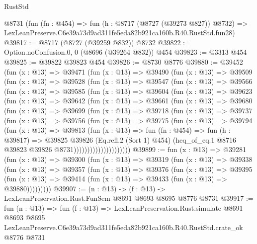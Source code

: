 \begin{lexlean}{RustStd}
\begin{coremodule}
    @8731
    (fun (fn : @454) =>
    fun (h : @8717 (@8727 (@39273 @827)) @8732) =>
    LexLeanPreserve.C6e39a73d9ad311fe5eda82b921ca160b.R40.RustStd.fun28)
@39817 := @8717 (@8727 (@39259 @832)) @8732
@39822 := Option.noConfusion.{0, 0} (@8696 (@39264 @832)) @454
@39823 := @3313 @454
@39825 := @39822 @39823 @454
@39826 := @8730 @8776
@39880 := @39452
    (fun (x : @13) =>
    @39471
      (fun (x : @13) =>
      @39490
        (fun (x : @13) =>
        @39509
          (fun (x : @13) =>
          @39528
            (fun (x : @13) =>
            @39547
              (fun (x : @13) =>
              @39566
                (fun (x : @13) =>
                @39585
                  (fun (x : @13) =>
                  @39604
                    (fun (x : @13) =>
                    @39623
                      (fun (x : @13) =>
                      @39642
                        (fun (x : @13) =>
                        @39661
                          (fun (x : @13) =>
                          @39680
                            (fun (x : @13) =>
                            @39699
                              (fun (x : @13) =>
                              @39718
                                (fun (x : @13) =>
                                @39737
                                  (fun (x : @13) =>
                                  @39756
                                    (fun (x : @13) =>
                                    @39775
                                      (fun (x : @13) =>
                                      @39794
                                        (fun (x : @13) =>
                                        @39813
                                          (fun (x : @13) =>
                                          fun (fn : @454) =>
                                          fun (h : @39817) =>
                                          @39825
                                            @39826
                                            (Eq.refl.{2} (Sort 1) @454)
                                            (heq_of_eq.{1}
                                              @8716
                                              @39823
                                              @39826
                                              @8731)))))))))))))))))))))
@39899 := fun (x : @13) =>
  @39281
    (fun (x : @13) =>
    @39300
      (fun (x : @13) =>
      @39319
        (fun (x : @13) =>
        @39338
          (fun (x : @13) =>
          @39357
            (fun (x : @13) =>
            @39376
              (fun (x : @13) =>
              @39395
                (fun (x : @13) => @39414 (fun (x : @13) => @39433 (fun (x : @13) => @39880)))))))))
@39907 := (n : @13) -> (f : @13) -> LexLeanPreservation.Rust.FunSem @8691 @8693 @8695 @8776 @8731
@39917 := fun (n : @13) =>
  fun (f : @13) =>
  LexLeanPreservation.Rust.simulate
    @8691
    @8693
    @8695
    LexLeanPreserve.C6e39a73d9ad311fe5eda82b921ca160b.R40.RustStd.crate_ok
    @8776
    @8731
\end{coremodule}
\end{lexlean}
